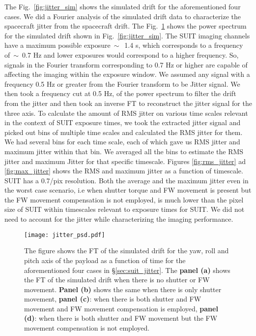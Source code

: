 The Fig.~\ref{fig:jitter_sim} shows the simulated drift for the aforementioned four cases. We did a Fourier analysis of the simulated drift data to characterize the spacecraft jitter from the spacecraft drift. The Fig.~\ref{fig:jitter_sim_ps} shows the power spectrum for the simulated drift shown in Fig.~\ref{fig:jitter_sim}. The SUIT imaging channels have a maximum possible exposure$~\sim$~1.4 s, which corresponds to a frequency of~$\sim$~0.7 Hz and lower exposures would correspond to a higher frequency. So, signals in the Fourier transform corresponding to 0.7 Hz or higher are capable of affecting the imaging within the exposure window. We assumed any signal with a frequency 0.5 Hz or greater from the Fourier transform to be Jitter signal. We then took a frequency cut at 0.5 Hz, of the power spectrum to filter the drift from the jitter and then took an inverse FT to reconstruct the jitter signal for the three axis. To calculate the amount of RMS jitter on various time scales relevant in the context of SUIT exposure times, we took the extracted jitter signal and picked out bins of multiple time scales and calculated the RMS jitter for them. We had several bins for each time scale, each of which gave us RMS jitter and maximum jitter within that bin. We averaged all the bins to estimate the RMS jitter and maximum Jitter for that specific timescale. Figures \ref{fig:rms_jitter} ad \ref{fig:max_jitter} shows the RMS and maximum jitter as a function of timescale. SUIT has a 0.7\arcsec/pix resolution. Both the average and the maximum jitter even in the worst case scenario, i.e when shutter torque and FW movement is present but the FW movement compensation is not employed, is much lower than the pixel size of SUIT within timescales relevant to exposure times for SUIT. We did not need to account for the jitter while characterizing the imaging performance.

\begin{figure}
    \centering
    \texttt{[image: jitter\_psd.pdf]}
    \caption{The figure shows the FT of the simulated drift for the yaw, roll and pitch axis of the payload as a function of time for the aforementioned four cases in \S\ref{sec:suit_jitter}. The \textbf{panel (a)} shows the FT of the simulated drift when there is no shutter or FW movement. \textbf{Panel (b)} shows the same when there is only shutter movement, \textbf{panel (c)}: when there is both shutter and FW movement and FW movement compensation is employed, \textbf{panel (d)}: when there is both shutter and FW movement but the FW movement compensation is not employed.}
    \label{fig:jitter_sim_ps}
\end{figure}

